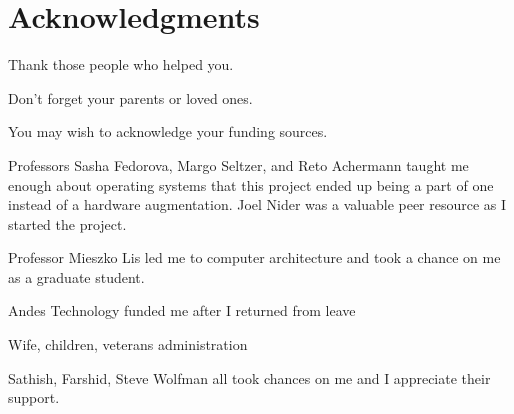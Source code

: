 
\chapter{Acknowledgments}

Thank those people who helped you. 

Don't forget your parents or loved ones.

You may wish to acknowledge your funding sources.

Professors Sasha Fedorova, Margo Seltzer, and Reto Achermann taught me enough about operating systems that this project ended up being a part of one instead of a hardware augmentation. Joel Nider was a valuable peer resource as I started the project.

Professor Mieszko Lis led me to computer architecture and took a chance on me as a graduate student.

Andes Technology funded me after I returned from leave

Wife, children, veterans administration

Sathish, Farshid, Steve Wolfman all took chances on me and I appreciate their support.